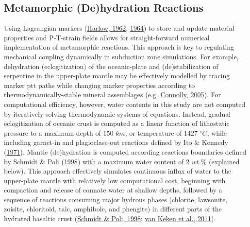 \hypertarget{numHydration}{%
\subsection{Metamorphic (De)hydration Reactions}\label{numHydration}}

Using Lagrangian markers (\protect\hyperlink{ref-harlow1962}{Harlow, 1962}, \protect\hyperlink{ref-harlow1964}{1964}) to store and update material properties and P-T-strain fields allows for straight-forward numerical implementation of metamorphic reactions. This approach is key to regulating mechanical coupling dynamically in subduction zone simulations. For example, dehydration (eclogitization) of the oceanic-plate and (de)stabilization of serpentine in the upper-plate mantle may be effectively modelled by tracing marker \gls{ptt} paths while changing marker properties according to thermodynamically-stable mineral assemblages (e.g. \protect\hyperlink{ref-connolly2005}{Connolly, 2005}). For computational efficiency, however, water contents in this study are not computed by iteratively solving thermodynamic systems of equations. Instead, gradual eclogitization of oceanic crust is computed as a linear function of lithostatic pressure to a maximum depth of 150 \(km\), or temperature of 1427 \(^\circ C\), while including garnet-in and plagioclase-out reactions defined by Ito \& Kennedy (\protect\hyperlink{ref-ito1971}{1971}). Mantle (de)hydration is computed according reactions boundaries defined by Schmidt \& Poli (\protect\hyperlink{ref-schmidt1998}{1998}) with a maximum water content of 2 \(wt.\%\) (explained below). This approach effectively simulates continuous influx of water to the upper-plate mantle with relatively low computational cost, beginning with compaction and release of connate water at shallow depths, followed by a sequence of reactions consuming major hydrous phases (chlorite, lawsonite, zoisite, chloritoid, talc, amphibole, and phengite) in different parts of the hydrated basaltic crust (\protect\hyperlink{ref-schmidt1998}{Schmidt \& Poli, 1998}; \protect\hyperlink{ref-vankeken2011}{van Keken et al., 2011}).

